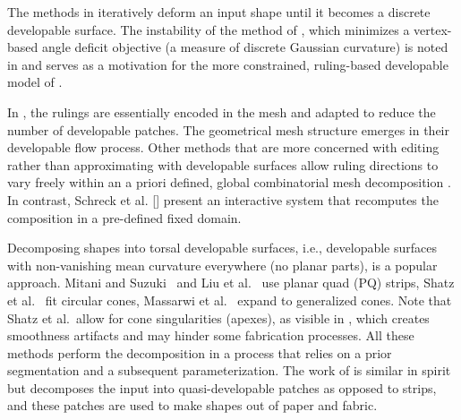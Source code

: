 The methods in \cite{wang2004achieving,stein_dev} iteratively deform an input shape until it becomes a discrete developable surface. The instability of the method of \cite{wang2004achieving}, which minimizes a vertex-based angle deficit objective (a measure of discrete Gaussian curvature) is noted in \cite{stein_dev,zhao2006triangular} and serves as a motivation for the more constrained, ruling-based developable model of \cite{stein_dev}. 

In \cite{stein_dev}, the rulings are essentially encoded in the mesh and adapted to reduce the number of developable patches. The geometrical mesh structure emerges in their developable flow process. Other methods that are more concerned with editing rather than approximating with developable surfaces allow ruling directions to vary freely within an a priori defined, global combinatorial mesh decomposition \cite{Solomon:Flexible:2012,Bo:GeodesicControlled:2007}. In contrast, Schreck et al. [\citeyear{Schreck:Crumpling:2015}] present an interactive system that recomputes the composition in a pre-defined fixed domain.

Decomposing shapes into torsal developable surfaces, i.e., developable surfaces with non-vanishing mean curvature everywhere (no planar parts), is a popular approach. Mitani and Suzuki~ and Liu et al.~ use planar quad (PQ) strips, Shatz et al.~ fit circular cones, Massarwi et al.~ expand to generalized cones. Note that Shatz et al.\ allow for cone singularities (apexes), as visible in , which creates smoothness artifacts and may hinder some fabrication processes. All these methods perform the decomposition in a process that relies on a prior segmentation and a subsequent parameterization. 
The work of \cite{julius2005d} is similar in spirit but decomposes the input into quasi-developable patches as opposed to strips, and these patches are used to make shapes out of paper and fabric. 


